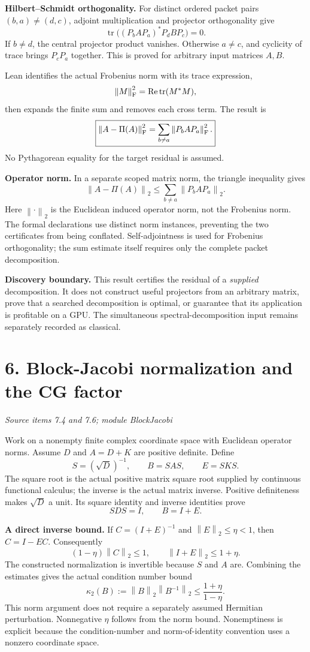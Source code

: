 \documentclass[11pt]{article}
\newcommand{\pageheading}[2]{\section*{\color{ink}#1}\textit{#2}\par}
\newcommand{\norm}[1]{\left\lVert#1\right\rVert}
\begin{document}
\textbf{Hilbert--Schmidt orthogonality.} For distinct ordered packet pairs $(b,a)\ne(d,c)$, adjoint multiplication and projector orthogonality give
\[
\operatorname{tr}\bigl((P_bAP_a)^*P_dBP_c\bigr)=0.
\]
If $b\ne d$, the central projector product vanishes. Otherwise $a\ne c$, and cyclicity of trace brings $P_cP_a$ together. This is proved for arbitrary input matrices $A,B$.

Lean identifies the actual Frobenius norm with its trace expression,
\[
\norm{M}_{\rm F}^2=\operatorname{Re}\operatorname{tr}(M^*M),
\]
then expands the finite sum and removes each cross term. The result is
\[
\boxed{\norm{A-\Pi(A)}_{\rm F}^2
=\sum_{b\ne a}\norm{P_bAP_a}_{\rm F}^2.}
\]
No Pythagorean equality for the target residual is assumed.

\textbf{Operator norm.} In a separate scoped matrix norm, the triangle inequality gives
\[
\boxed{\norm{A-\Pi(A)}_2
\leq\sum_{b\ne a}\norm{P_bAP_a}_2.}
\]
Here $\norm{\cdot}_2$ is the Euclidean induced operator norm, not the Frobenius norm. The formal declarations use distinct norm instances, preventing the two certificates from being conflated. Self-adjointness is used for Frobenius orthogonality; the sum estimate itself requires only the complete packet decomposition.

\textbf{Discovery boundary.} This result certifies the residual of a \emph{supplied} decomposition. It does not construct useful projectors from an arbitrary matrix, prove that a searched decomposition is optimal, or guarantee that its application is profitable on a GPU. The simultaneous spectral-decomposition input remains separately recorded as classical.

\newpage
\pageheading{6. Block-Jacobi normalization and the CG factor}{Source items 7.4 and 7.6; module BlockJacobi}
Work on a nonempty finite complex coordinate space with Euclidean operator norms. Assume $D$ and $A=D+K$ are positive definite. Define
\[
S=(\sqrt D)^{-1},\qquad B=SAS,\qquad E=SKS.
\]
The square root is the actual positive matrix square root supplied by continuous functional calculus; the inverse is the actual matrix inverse. Positive definiteness makes $\sqrt D$ a unit. Its square identity and inverse identities prove
\[
SDS=I,\qquad B=I+E.
\]

\textbf{A direct inverse bound.} If $C=(I+E)^{-1}$ and $\norm E_2\leq\eta<1$, then $C=I-EC$. Consequently
\[
(1-\eta)\norm C_2\leq 1,
\qquad \norm{I+E}_2\leq 1+\eta.
\]
The constructed normalization is invertible because $S$ and $A$ are. Combining the estimates gives the actual condition number bound
\[
\boxed{\kappa_2(B):=\norm B_2\norm{B^{-1}}_2
\leq\frac{1+\eta}{1-\eta}.}
\]
This norm argument does not require a separately assumed Hermitian perturbation. Nonnegative $\eta$ follows from the norm bound. Nonemptiness is explicit because the condition-number and norm-of-identity convention uses a nonzero coordinate space.
\end{document}
